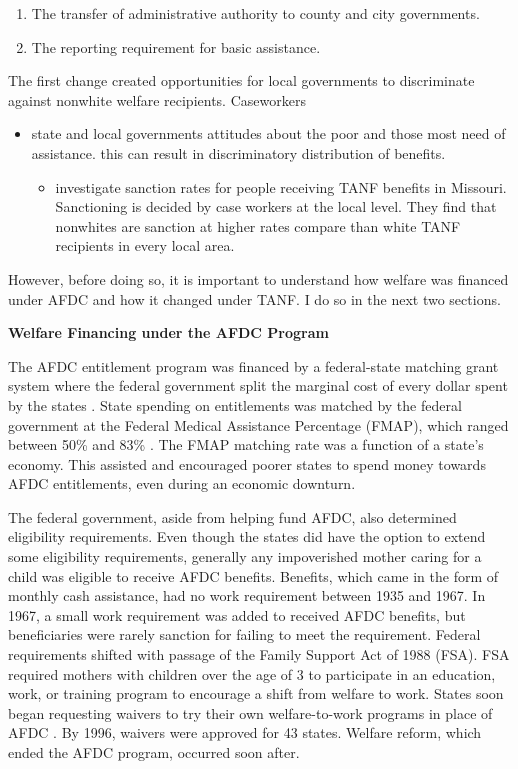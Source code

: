 \documentclass[12pt,letterpaperpaper,]{book}
\providecommand{\tightlist}{%
  \setlength{\itemsep}{0pt}\setlength{\parskip}{0pt}}
\begin{document}
\begin{enumerate}
\def\labelenumi{\arabic{enumi}.}
\tightlist
\item
  The transfer of administrative authority to county and city
  governments.
\item
  The reporting requirement for basic assistance.
\end{enumerate}

The first change created opportunities for local governments to
discriminate against nonwhite welfare recipients. Caseworkers

\begin{itemize}
\tightlist
\item
  state and local governments attitudes about the poor and those most
  need of assistance. this can result in discriminatory distribution of
  benefits.

  \begin{itemize}
  \tightlist
  \item
    \citep{keiser_race_2004} investigate sanction rates for people
    receiving TANF benefits in Missouri. Sanctioning is decided by case
    workers at the local level. They find that nonwhites are sanction at
    higher rates compare than white TANF recipients in every local area.
  \end{itemize}
\end{itemize}

However, before doing so, it is important to understand how welfare was
financed under AFDC and how it changed under TANF. I do so in the next
two sections.

\textbf{Welfare Financing under the AFDC Program}

The AFDC entitlement program was financed by a federal-state matching
grant system where the federal government split the marginal cost of
every dollar spent by the states \citep{ziliak_temporary_2015}. State
spending on entitlements was matched by the federal government at the
Federal Medical Assistance Percentage (FMAP), which ranged between 50\%
and 83\% \citep{falk_temporary_2016}. The FMAP matching rate was a
function of a state's economy. This assisted and encouraged poorer
states to spend money towards AFDC entitlements, even during an economic
downturn.

The federal government, aside from helping fund AFDC, also determined
eligibility requirements. Even though the states did have the option to
extend some eligibility requirements, generally any impoverished mother
caring for a child was eligible to receive AFDC benefits. Benefits,
which came in the form of monthly cash assistance, had no work
requirement between 1935 and 1967. In 1967, a small work requirement was
added to received AFDC benefits, but beneficiaries were rarely sanction
for failing to meet the requirement. Federal requirements shifted with
passage of the Family Support Act of 1988 (FSA). FSA required mothers
with children over the age of 3 to participate in an education, work, or
training program to encourage a shift from welfare to work. States soon
began requesting waivers to try their own welfare-to-work programs in
place of AFDC \citep{blank_what_2007}. By 1996, waivers were approved
for 43 states. Welfare reform, which ended the AFDC program, occurred
soon after.
\end{document}
